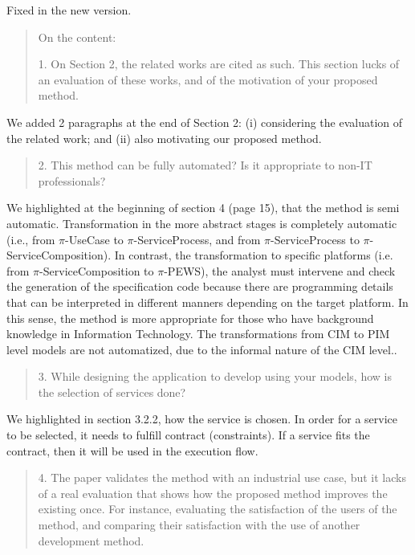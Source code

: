 \documentclass[12pt,a4wide]{article}
\begin{document}
\noindent 
Fixed in the new version.


\begin{quotation}\sf\footnotesize

\noindent On the content: 

1.    On Section 2, the related works are cited as such. This section lucks of an evaluation of these works, and of the motivation of your proposed method. 
\end{quotation}

\noindent 
We added 2 paragraphs at the end of Section 2: (i) considering the evaluation of the related work; and (ii) also motivating our proposed method. 
\begin{quotation}\sf\footnotesize

2.    This method can be fully automated? Is it appropriate to non-IT professionals? 
\end{quotation}

\noindent 
We highlighted at the beginning of section 4 (page 15), that the method is semi automatic. Transformation in the more abstract stages is completely automatic  (i.e., from $\pi$-UseCase to $\pi$-ServiceProcess, and from $\pi$-ServiceProcess to $\pi$-ServiceComposition). In contrast, the transformation to specific platforms (i.e. from $\pi$-ServiceComposition to $\pi$-PEWS), the analyst must intervene and check the generation of the specification code because there are programming details that can be interpreted in different manners depending on the target platform. In this sense, the method is more appropriate for those who have background knowledge in Information Technology.
The transformations from CIM to PIM level models are not automatized, due to the informal nature of the CIM level..

\begin{quotation}\sf\footnotesize

3.    While designing the application to develop using your models, how is the selection of services done? 
\end{quotation}

\noindent 
We highlighted in section 3.2.2, how the service is chosen. In order for a service to be selected, it needs to fulfill contract (constraints). If a service fits the contract, then it will be used in the execution flow.

\begin{quotation}\sf\footnotesize

4.    The paper validates the method with an industrial use case, but it lacks of a real evaluation that shows how the proposed method improves the existing once. For instance, evaluating the satisfaction of the users of the method, and comparing their satisfaction with the use of another development method. 
\end{quotation}
\end{document}
